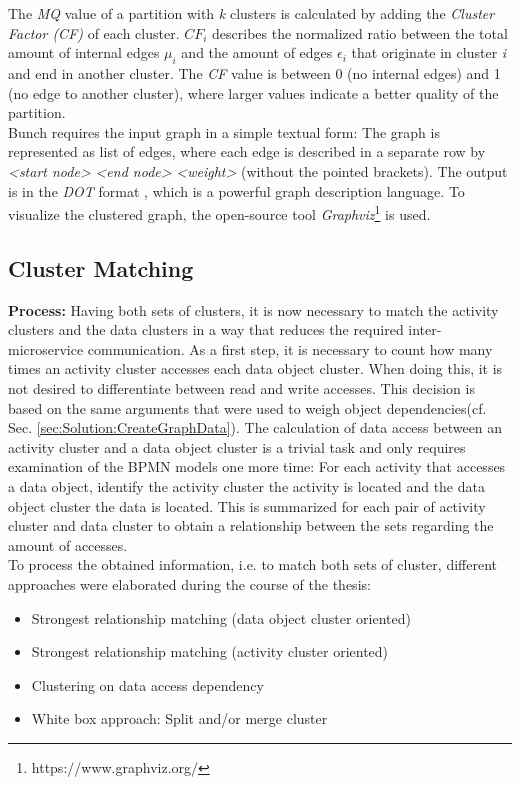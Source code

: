 \noindent
The \textit{MQ} value of a partition with \textit{k} clusters is calculated by adding the \textit{Cluster Factor (CF)} of each cluster. $CF_{i}$ describes the normalized ratio between the total amount of internal edges $\mu_{i}$ and the amount of edges $\epsilon_{i}$ that originate in cluster \textit{i} and end in another cluster. The \textit{CF} value is between 0 (no internal edges) and 1 (no edge to another cluster), where larger values indicate a better quality of the partition. \\
Bunch requires the input graph in a simple textual form: The graph is represented as list of edges, where each edge is described in a separate row by \textit{<start node>} \textit{<end node>} \textit{<weight>} (without the pointed brackets). The output is in the \textit{DOT} format \cite{DOT}, which is a powerful graph description language. To visualize the clustered graph, the open-source tool \textit{Graphviz}\footnote{https://www.graphviz.org/} is used.




\subsection{Cluster Matching}
\label{sec:Solution:MatchCluster}
\textbf{Process:} Having both sets of clusters, it is now necessary to match the activity clusters and the data clusters in a way that reduces the required inter-microservice communication. As a first step, it is necessary to count how many times an activity cluster accesses each data object cluster. When doing this, it is not desired to differentiate between read and write accesses. This decision is based on the same arguments that were used to weigh object dependencies(cf. Sec. \ref{sec:Solution:CreateGraphData}). The calculation of data access between an activity cluster and a data object cluster is a trivial task and only requires examination of the BPMN models one more time: For each activity that accesses a data object, identify the activity cluster the activity is located and the data object cluster the data is located. This is summarized for each pair of activity cluster and data cluster to obtain a relationship between the sets regarding the amount of accesses.\\
To process the obtained information, i.e. to match both sets of cluster, different approaches were elaborated during the course of the thesis:

\begin{itemize}
	\item Strongest relationship matching (data object cluster oriented)
	\item Strongest relationship matching (activity cluster oriented)
	\item Clustering on data access dependency
	\item White box approach: Split and/or merge cluster
\end{itemize}

